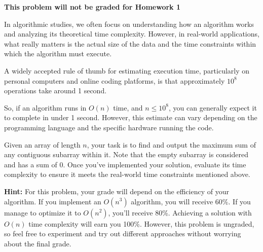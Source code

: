 \textbf{This problem will not be graded for Homework 1} 

In algorithmic studies, we often focus on understanding how an algorithm works and analyzing its theoretical time complexity. However, in real-world applications, what really matters is the actual size of the data and the time constraints within which the algorithm must execute.

A widely accepted rule of thumb for estimating execution time, particularly on personal computers and online coding platforms, is that approximately $10^8$ operations take around 1 second.

So, if an algorithm runs in $O(n)$ time, and $n \le 10^8$, you can generally expect it to complete in under 1 second. However, this estimate can vary depending on the programming language and the specific hardware running the code.

Given an array of length $n$, your task is to find and output the maximum sum of any contiguous subarray within it. Note that the empty subarray is considered and has a sum of 0. Once you've implemented your solution, evaluate its time complexity to ensure it meets the real-world time constraints mentioned above.

\textbf{Hint: } For this problem, your grade will depend on the efficiency of your algorithm. If you implement an $O(n^3)$ algorithm, you will receive 60\%. If you manage to optimize it to $O(n^2)$, you'll receive 80\%. Achieving a solution with $O(n)$ time complexity will earn you 100\%. However, this problem is ungraded, so feel free to experiment and try out different approaches without worrying about the final grade.
